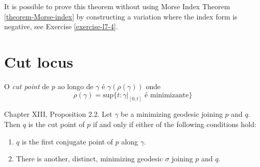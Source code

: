 It is possible to prove this theorem without using Morse Index Theorem
\ref{theorem-Morse-index} by constructing a variation where the index form is
negative, see Exercise \ref{exercise-l7-4}.

\section{Cut locus}
\label{section-cut-locus}

\begin{definition}
\label{definition-cut-point}
O {\it cut point} de  $p$ ao longo de $\gamma$ é $\gamma(\rho(\gamma))$ 
onde
$$
\rho(\gamma)=\text{sup}\{t:\gamma|_{[0,t]}\text{ é minimizante}\}
$$

\end{definition}

\begin{proposition}
\label{proposition-cut-point-characterization}
\cite{doc} Chapter XIII, Proposition 2.2. Let $\gamma$ be a minimizing geodesic joining $p$ and $q$. Then $q$ is the cut
point of $p$ if and only if either of the following conditions hold:
\begin{enumerate}
\item $q$ is the first conjugate point of $p$ along $\gamma$.
\item There is another, distinct, minimizing geodesic $\sigma$ joining $p$ and
 $q$.
\end{enumerate}
\end{proposition}

